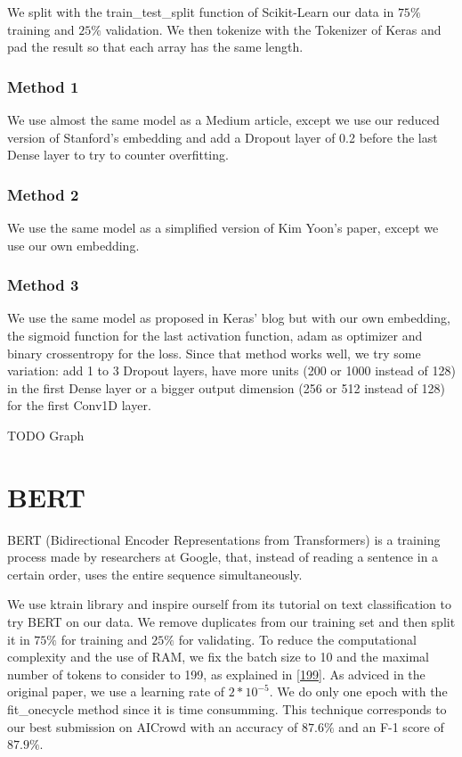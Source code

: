 \documentclass[11pt, a4paper, twocolumn]{article}
\begin{document}
We split with the train\_test\_split function of Scikit-Learn our data in $75\%$ training and $25\%$ validation. We then tokenize with the Tokenizer of Keras and pad the result so that each array has the same length.

\subsubsection{Method 1}
We use almost the same model as a Medium article\cite{cnn1}, except we use our reduced version of Stanford's embedding and add a Dropout layer of 0.2 before the last Dense layer to try to counter overfitting.

\subsubsection{Method 2}
We use the same model as a simplified version\cite{cnn2} of Kim Yoon's paper\cite{kimyoonpaper}, except we use our own embedding.

\subsubsection{Method 3}
We use the same model as proposed in Keras' blog\cite{cnn3} but with our own embedding, the sigmoid function for the last activation function, adam as optimizer and binary crossentropy for the loss.
Since that method works well, we try some variation: add 1 to 3 Dropout layers, have more units (200 or 1000 instead of 128) in the first Dense layer or a bigger output dimension (256 or 512 instead of 128) for the first Conv1D layer.


TODO Graph

\section{BERT}
BERT (Bidirectional Encoder Representations from Transformers)\cite{bertpaper} is a training process made by researchers at Google, that, instead of reading a sentence in a certain order, uses the entire sequence simultaneously.

We use ktrain library\cite{ktrain} and inspire ourself from its tutorial on text classification to try BERT on our data. We remove duplicates from our training set and then split it in $75\%$ for training and $25\%$ for validating. To reduce the computational complexity and the use of RAM, we fix the batch size to 10 and the maximal number of tokens to consider to 199, as explained in \ref{199}. As adviced in the original paper, we use a learning rate of $2*10^{-5}$. We do only one epoch with the fit\_onecycle method since it is time consumming. This technique corresponds to our best submission on AICrowd with an accuracy of $87.6\%$ and an F-1 score of $87.9\%$.
\end{document}

